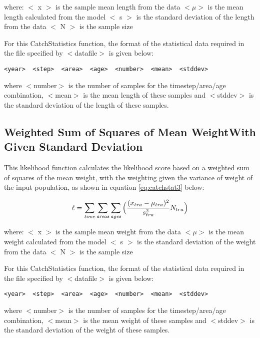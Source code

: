\documentclass[]{book}
\begin{document}
where: \(<\) x \(>\) is the sample mean length from the data \(<\mu>\) is the
mean length calculated from the model \(<\) s \(>\) is the standard
deviation of the length from the data \(<\) N \(>\) is the sample size

For this CatchStatistics function, the format of the statistical data
required in the file specified by \(<\)datafile\(>\) is given below:

\begin{verbatim}
<year>  <step>  <area>  <age>  <number>  <mean>  <stddev>
\end{verbatim}

where \(<\)number\(>\) is the number of samples for the timestep/area/age
combination, \(<\)mean\(>\) is the mean length of these samples and
\(<\)stddev\(>\) is the standard deviation of the length of these samples.

\hypertarget{weighted-sum-of-squares-of-mean-weightwith-given-standard-deviation}{%
\subsection{Weighted Sum of Squares of Mean WeightWith Given Standard Deviation}\label{weighted-sum-of-squares-of-mean-weightwith-given-standard-deviation}}

This likelihood function calculates the likelihood score based on a
weighted sum of squares of the mean weight, with the weighting given the
variance of weight of the input population, as shown in
equation \eqref{eq:catchstat3} below:

\begin{equation}
\label{eq:catchstat3}
\ell = \sum_{\it time}\sum_{\it areas}\sum_{\it ages} \Big(\frac{(x_{tra}-\mu_{tra})^2} {s_{tra}^2} N_{tra}\Big)\end{equation}

where: \(<\) x \(>\) is the sample mean weight from the data \(<\mu>\) is the
mean weight calculated from the model \(<\) s \(>\) is the standard
deviation of the weight from the data \(<\) N \(>\) is the sample size

For this CatchStatistics function, the format of the statistical data
required in the file specified by \(<\)datafile\(>\) is given below:

\begin{verbatim}
<year>  <step>  <area>  <age>  <number>  <mean>  <stddev>
\end{verbatim}

where \(<\)number\(>\) is the number of samples for the timestep/area/age
combination, \(<\)mean\(>\) is the mean weight of these samples and
\(<\)stddev\(>\) is the standard deviation of the weight of these samples.
\end{document}
